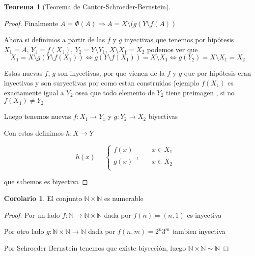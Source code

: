 \documentclass[12pt]{article}
\newcommand{\N}{\mathbb{N}}
\newcommand{\Ra}{\Rightarrow}
\newcommand{\ra}{\rightarrow}
\theoremstyle{definition}
\newtheorem{theorem}{Teorema}
\newtheorem{corollary}{Corolario}[theorem]
\begin{document}
\begin{theorem}[Teorema de Cantor-Schroeder-Bernstein]
\begin{proof}
Finalmente $ A = \Phi (A) \Ra A = X \setminus (g(Y \setminus f(A)) $

  Ahora si definimos a partir de las $f$ y $g$ inyectivas que tenemos por hipótesis $X_{1} = A$, $Y_{1} = f(X_{1})$, $Y_{2} = Y \setminus Y_{1}$, $X \setminus X_{1} = X_{2}$ podemos ver que $$ X_{1} = X \setminus g (Y \setminus f(X_{1})) \iff g(Y \setminus f(X_{1})) = X \setminus X_{1} \iff g(Y_{2}) = X \setminus X_{1} = X_{2}$$ 
  
  Estas nuevas $f$, $g$ son inyectivas, por que vienen de la $f$ y $g$ que por hipótesis eran inyectivas y son suryectivas por como estan construidas (ejemplo $f(X_{1})$ es exactamente igual a $Y_{2}$ osea que todo elemento de $Y_{2}$ tiene preimagen , si no $f(X_{1}) \neq Y_{2}$

    Luego tenemos nuevas $f: X_{1} \ra Y_{1}$ y $g: Y_{2} \ra X_{2}$ biyectivas

    Con estas definimos $h : X \ra Y$ 

\[
h(x) =
     \begin{cases}
       \text{$f(x)$} &\quad\text{$x \in X_{1}$ }\\
       \text{$g(x)^{-1}$} &\quad\text{$x \in X_{2}$} \\
     \end{cases}
\]

que sabemos es biyectiva
  \end{proof}


\end{theorem}

\begin{corollary}
  El conjunto $\N \times \N$ es numerable

  \begin{proof}
    Por un lado $f: \N \ra \N \times \N$ dada por $f(n) = (n,1)$ es inyectiva

    Por otro lado $g: \N \times \N \ra \N $ dada por $f(n,m) = 2^n3^m $ tambien inyectiva

    Por Schroeder Bernstein tenemos que existe biyección, luego $\N \times \N \sim \N$
  \end{proof}
\end{corollary}
\end{document}
